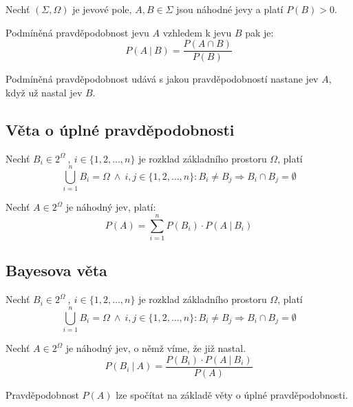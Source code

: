 \begin{compactitem}
    \item Nechť $(\Sigma, \Omega)$ je jevové pole, $A, B \in \Sigma$ jsou náhodné jevy a platí $P(B) > 0$.

    \item Podmíněná pravděpodobnost jevu $A$ vzhledem k jevu $B$ pak je:
    $$ P(A ~|~ B) = \frac{P(A \cap B)}{P(B)} $$

    \item Podmíněná pravděpodobnost udává s jakou pravděpodobností nastane jev $A$, když už nastal jev $B$.
\end{compactitem}

\subsection{Věta o úplné pravděpodobnosti}

\begin{compactitem}
    \item Nechť $B_i \in 2^{\Omega} ~,~ i \in \{ 1, 2, \ldots, n \}$ je rozklad základního prostoru $\Omega$, platí
    $$ \bigcup_{i=1}^n B_i = \Omega ~\land~ i, j \in \{ 1, 2, \ldots, n \} : B_i \not= B_j \Rightarrow B_i \cap B_j = \emptyset $$

    \item Nechť $A \in 2^{\Omega}$ je náhodný jev, platí:
    $$ P(A) = \sum_{i=1}^n P(B_i) \cdot P(A ~|~ B_i) $$
\end{compactitem}

\subsection{Bayesova věta}

\begin{compactitem}
    \item Nechť $B_i \in 2^{\Omega} ~,~ i \in \{ 1, 2, \ldots, n \}$ je rozklad základního prostoru $\Omega$, platí
    $$ \bigcup_{i=1}^n B_i = \Omega ~\land~ i, j \in \{ 1, 2, \ldots, n \} : B_i \not= B_j \Rightarrow B_i \cap B_j = \emptyset $$

    \item Nechť $A \in 2^{\Omega}$ je náhodný jev, o němž víme, že již nastal.
    $$ P(B_i ~|~ A) = \frac{P(B_i) \cdot P(A ~|~ B_i)}{P(A)}$$

    \item Pravděpodobnost $P(A)$ lze spočítat na základě věty o úplné pravděpodobnosti.
\end{compactitem}


